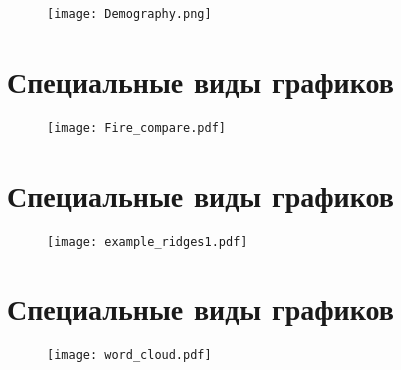 \documentclass[xcolor=dvipsnames, 12pt]{beamer}
\begin{document}
\begin{frame}

\begin{figure}[h!]
\hspace*{-1cm}
 \centering
 \texttt{[image: Demography.png]}

\end{figure}

\end{frame}

\section{Специальные виды графиков }

\begin{frame}

\begin{figure}[h!]
\hspace*{-1cm}
 \centering
 \texttt{[image: Fire\_compare.pdf]}

\end{figure}

\end{frame}

\section{Специальные виды графиков }

\begin{frame}

\begin{figure}[h!]
\hspace*{-1cm}
 \centering
 \texttt{[image: example\_ridges1.pdf]}

\end{figure}

\end{frame}

\section{Специальные виды графиков }

\begin{frame}

\begin{figure}[h!]
\hspace*{-1cm}
 \centering
 \texttt{[image: word\_cloud.pdf]}

\end{figure}

\end{frame}
\end{document}
